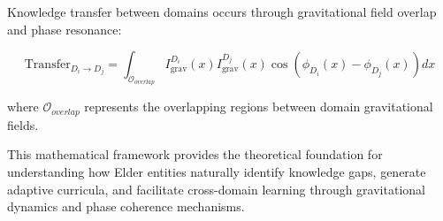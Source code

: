 Knowledge transfer between domains occurs through gravitational field overlap and phase resonance:

\begin{equation}
\text{Transfer}_{D_i \rightarrow D_j} = \int_{\mathcal{O}_{overlap}} I_{\text{grav}}^{D_i}(x) I_{\text{grav}}^{D_j}(x) \cos(\phi_{D_i}(x) - \phi_{D_j}(x)) dx
\end{equation}

where $\mathcal{O}_{overlap}$ represents the overlapping regions between domain gravitational fields.

This mathematical framework provides the theoretical foundation for understanding how Elder entities naturally identify knowledge gaps, generate adaptive curricula, and facilitate cross-domain learning through gravitational dynamics and phase coherence mechanisms.